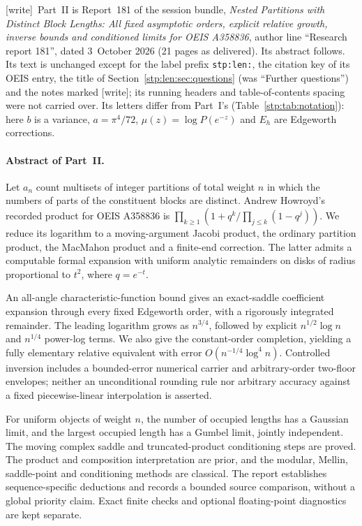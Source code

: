 \documentclass[11pt]{article}
\theoremstyle{remark}\newtheorem{remark}[theorem]{Remark}
\newcommand{\wtag}{\textup{[write]}}
\begin{document}
\wtag\ Part~II is Report~181 of the session bundle, \emph{Nested Partitions
with Distinct Block Lengths: All fixed asymptotic orders, explicit relative
growth, inverse bounds and conditioned limits for OEIS A358836}, author line
``Research report 181'', dated 3~October 2026 (21 pages as delivered). Its
abstract follows. Its text is unchanged except for the label prefix
\texttt{stp:len:}, the citation key of its OEIS entry, the title of
Section~\ref{stp:len:sec:questions} (was ``Further questions'') and the notes
marked \wtag; its running headers and table-of-contents spacing were not
carried over. Its letters differ from Part~I's
(Table~\ref{stp:tab:notation}): here $b$ is a variance, $a=\pi^4/72$, $\mu(z)=\log P(e^{-z})$
and $E_h$ are Edgeworth corrections.

\paragraph{Abstract of Part~II.}
{\small
Let $a_n$ count multisets of integer partitions of total weight $n$ in which the numbers of parts of the constituent blocks are distinct. Andrew Howroyd's recorded product for OEIS A358836 is
$\prod_{k\ge1}(1+q^k/\prod_{j\le k}(1-q^j))$.
We reduce its logarithm to a moving-argument Jacobi product, the ordinary partition product, the MacMahon product and a finite-end correction. The latter admits a computable formal expansion with uniform analytic remainders on disks of radius proportional to $t^2$, where $q=e^{-t}$.

An all-angle characteristic-function bound gives an exact-saddle coefficient expansion through every fixed Edgeworth order, with a rigorously integrated remainder. The leading logarithm grows as $n^{3/4}$, followed by explicit $n^{1/2}\log n$ and $n^{1/4}$ power-log terms. We also give the constant-order completion, yielding a fully elementary relative equivalent with error $O(n^{-1/4}\log^4 n)$. Controlled inversion includes a bounded-error numerical carrier and arbitrary-order two-floor envelopes; neither an unconditional rounding rule nor arbitrary accuracy against a fixed piecewise-linear interpolation is asserted.

For uniform objects of weight $n$, the number of occupied lengths has a Gaussian limit, and the largest occupied length has a Gumbel limit, jointly independent. The moving complex saddle and truncated-product conditioning steps are proved. The product and composition interpretation are prior, and the modular, Mellin, saddle-point and conditioning methods are classical. The report establishes sequence-specific deductions and records a bounded source comparison, without a global priority claim. Exact finite checks and optional floating-point diagnostics are kept separate.
}
\end{document}

